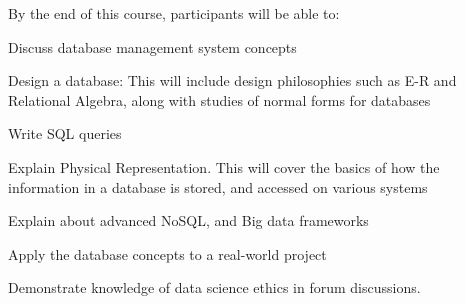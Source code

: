 By the end of this course, participants will be able to:

\begin{outline}
	\1  	Discuss database management system concepts
	
	\1  	Design a database: 
		This will include design philosophies such as E-R and Relational Algebra, along with studies of 
		normal forms for databases

	\1  	Write SQL queries

	\1  	Explain Physical Representation. 
		This will cover the basics of how the information in a database is stored, and accessed on various systems

	\1  	Explain about advanced NoSQL, and Big data frameworks 

	\1  	Apply the database concepts to a real-world project

	\1  	Demonstrate knowledge of data science ethics in forum discussions.

\end{outline} 